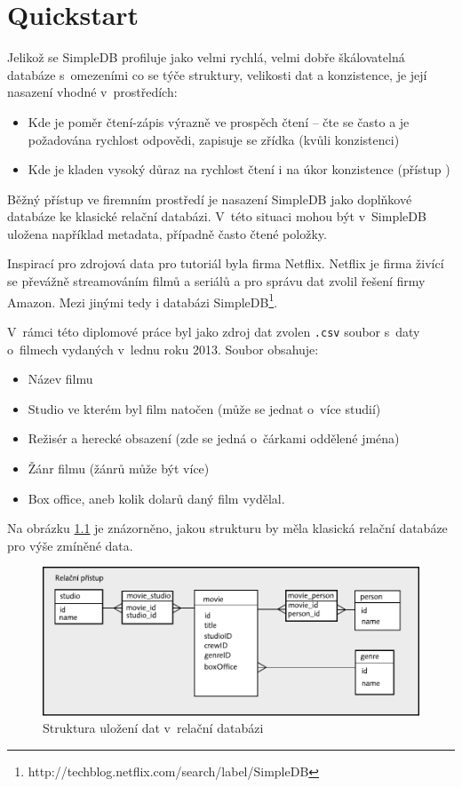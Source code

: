 \documentclass[oneside,12pt,final]{fithesis2}
\begin{document}
\chapter{Quickstart}
Jelikož se SimpleDB profiluje jako velmi rychlá, velmi dobře škálovatelná databáze s~omezeními co se týče struktury, velikosti dat a konzistence, je její nasazení vhodné v~prostředích:
\begin{itemize}
 \item Kde je poměr čtení-zápis výrazně ve prospěch čtení -- čte se často a je požadována rychlost odpovědi, zapisuje se zřídka (kvůli konzistenci)
 \item Kde je kladen vysoký důraz na rychlost čtení i na úkor konzistence (přístup )
\end{itemize}
Běžný přístup ve firemním prostředí je nasazení SimpleDB jako doplňkové databáze ke klasické relační databázi. V~této situaci mohou být v~SimpleDB uložena například metadata, případně často čtené položky.

Inspirací pro zdrojová data pro tutoriál byla firma Netflix. Netflix je firma živící se převážně streamováním filmů a seriálů a pro správu dat zvolil řešení firmy Amazon. Mezi jinými tedy i databázi SimpleDB\footnote{http://techblog.netflix.com/search/label/SimpleDB}.

V~rámci této diplomové práce byl jako zdroj dat zvolen \texttt{.csv} soubor s~daty o~filmech vydaných v~lednu roku 2013. Soubor obsahuje:
\begin{itemize}
 \item Název filmu
 \item Studio ve kterém byl film natočen (může se jednat o~více studií)
 \item Režisér a herecké obsazení (zde se jedná o~čárkami oddělené jména)
 \item Žánr filmu (žánrů může být více)
 \item Box office, aneb kolik dolarů daný film vydělal.
\end{itemize}
Na obrázku \ref{relationStructure} je znázorněno, jakou strukturu by měla klasická relační databáze pro výše zmíněné data. 
\begin{figure}[h]
 \centering
 \includegraphics[scale=0.8]{relationStructure}
 \caption{Struktura uložení dat v~relační databázi}
 \label{relationStructure}
\end{figure}
\end{document}
